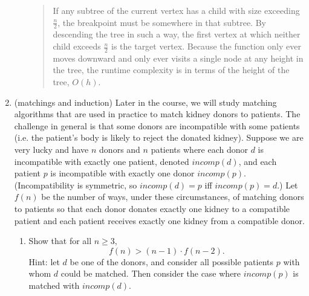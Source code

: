 \documentclass[11pt]{article}
\begin{document}
\begin{enumerate}
\begin{enumerate}
\begin{quote}
    \color{purple}
    If any subtree of the current vertex has a child with size exceeding $\frac{n}{2}$, the breakpoint must be somewhere in that subtree. By descending the tree in such a way, the first vertex at which neither child exceeds $\frac{n}{2}$ is the target vertex. Because the function only ever moves downward and only ever visits a single node at any height in the tree, the runtime complexity is in terms of the height of the tree, $O(h)$.
\end{quote}
 
 \end{enumerate}
 
 \newcommand{\incomp}{\mathit{incomp}}
 \item (matchings and induction)
 Later in the course, we will study matching algorithms that are used in practice to match kidney donors to patients.  The challenge in general is that some donors are incompatible with some patients (i.e. the patient's body is likely to reject the donated kidney).  Suppose we are very lucky and have $n$ donors and $n$ patients where each donor $d$ is incompatible with exactly one patient, denoted $\incomp(d)$, and each patient $p$ is incompatible with exactly one donor $\incomp(p)$. (Incompatibility is symmetric, so $\incomp(d)=p$ iff $\incomp(p)=d$.)  Let $f(n)$ be the number of ways, under these circumstances, of matching donors to patients so that each donor donates exactly one kidney to a compatible patient and each patient receives exactly one kidney from a compatible donor.  


 \begin{enumerate} 
\item Show that for all $n\geq 3$,
 $$ f(n) > (n-1)\cdot f(n-2).$$
 Hint: let $d$ be one of the donors, and consider all possible patients $p$ with whom $d$ could be matched.  Then consider the case where $\incomp(p)$ is matched with $\incomp(d)$.


\end{enumerate}
\end{enumerate}
\end{document}
